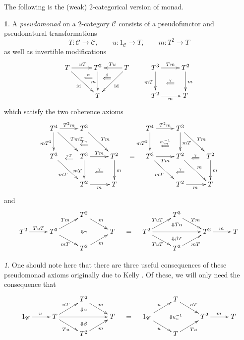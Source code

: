 \documentclass[a4paper,oneside,english]{amsart}
\numberwithin{equation}{section}
\numberwithin{figure}{section}
\theoremstyle{plain}
\theoremstyle{definition}
\newtheorem{defn}[thm]{\protect\definitionname}
\theoremstyle{remark}
\newtheorem{rem}[thm]{\protect\remarkname}
\theoremstyle{definition}
\theoremstyle{plain}
\theoremstyle{plain}
\theoremstyle{plain}
\providecommand{\definitionname}{Definition}
\providecommand{\remarkname}{Remark}
\begin{document}
The following is the (weak) 2-categorical version of monad.
\begin{defn}
A \emph{pseudomonad} on a 2-category $\mathscr{C}$ consists of a
pseudofunctor and pseudonatural transformations
\[
T\colon\mathscr{C}\to\mathscr{C},\qquad u\colon1_{\mathscr{C}}\to T,\qquad m\colon T^{2}\to T
\]
as well as invertible modifications
\[
\xymatrix@=1em{T\ar[rr]^{uT}\ar[rdrd]_{\textnormal{id}} &  & T^{2}\ar[dd]_{m} &  & T\ar[ll]_{Tu}\ar[ldld]^{\textnormal{id}} &  & T^{3}\ar[rr]^{Tm}\ar[dd]_{mT} &  & T^{2}\ar[dd]^{m}\\
 & \;\ar@{}[ru]|-{\overset{\alpha}{\Longleftarrow}} &  & \ar@{}[lu]|-{\overset{\beta}{\Longleftarrow}}\\
 &  & T &  &  &  & T^{2}\ar[rr]_{m} &  & T\ar@{}[lulu]|-{\overset{\gamma}{\Longleftarrow}}
}
\]
which satisfy the two coherence axioms
\[
\xymatrix@=1em{T^{4}\ar[rr]^{T^{2}m}\ar[dd]_{mT^{2}}\ar[rdrd]^{TmT} &  & T^{3}\ar[rrdd]^{Tm} &  &  &  & T^{4}\ar[rr]^{T^{2}m}\ar[dd]_{mT^{2}} &  & T^{3}\ar[rrdd]^{Tm}\ar[dd]^{mT}\\
 &  & \ar@{}[]|-{\overset{T\gamma}{\Longleftarrow}} &  &  &  &  & \ar@{}[]|-{\overset{m_{m}^{-1}}{\Longleftarrow}}\\
T^{3}\ar[rrdd]_{mT} & \ar@{}[]|-{\overset{\gamma T}{\Longleftarrow}} & T^{3}\ar[rr]^{Tm}\ar[dd]_{mT} &  & T^{2}\ar[dd]^{m} & = & T^{3}\ar[rrdd]_{mT}\ar[rr]_{Tm} &  & T^{2}\ar[rrdd]^{m} & \ar@{}[]|-{\overset{\gamma}{\Longleftarrow}} & T^{2}\ar[dd]^{m}\\
 &  &  & \ar@{}[]|-{\overset{\gamma}{\Longleftarrow}} &  &  &  &  & \ar@{}[]|-{\overset{\gamma}{\Longleftarrow}}\\
 &  & T^{2}\ar[rr]_{m} &  & T &  &  &  & T^{2}\ar[rr]_{m} &  & T
}
\]
and
\[
\xymatrix@=1em{ &  &  &  & T^{2}\ar[rrd]^{m} &  &  &  &  &  & T^{3}\ar[rrd]^{Tm}\\
T^{2}\ar[rr]^{TuT} &  & T^{3}\ar[rru]^{Tm}\ar[rrd]_{mT} &  & \ar@{}[]|-{\Downarrow\gamma} &  & T & = & T^{2}\ar[rur]^{TuT}\ar[rrd]_{TuT}\ar[rrrr] &  & \ar@{}[u]|-{\Downarrow T\alpha}\ar@{}[d]|-{\Downarrow\beta T} &  & T^{2}\ar[rr]^{m} &  & T\\
 &  &  &  & T^{2}\ar[rru]_{m} &  &  &  &  &  & T^{3}\ar[urr]_{mT}
}
\]
\end{defn}
\begin{rem}
One should note here that there are three useful consequences of these
pseudomonad axioms \cite[Proposition 8.1]{marm1997} originally due
to Kelly \cite{kellymaclanecoherence}. Of these, we will only need
the consequence that 
\[
\xymatrix@=1em{ &  &  &  & T^{2}\ar[rrd]^{m} &  &  &  &  &  & T\ar[rrd]^{uT}\\
1_{\mathscr{C}}\ar[rr]^{u} &  & T\ar[rru]^{uT}\ar[rrd]_{Tu}\ar[rrrr] &  & \ar@{}[u]|-{\Downarrow\alpha}\ar@{}[d]|-{\Downarrow\beta} &  & T & = & 1_{\mathscr{C}}\ar[rru]^{u}\ar[rrd]_{u} &  & \ar@{}[]|-{\Downarrow u_{u}^{-1}} &  & T^{2}\ar[rr]^{m} &  & T\\
 &  &  &  & T^{2}\ar[rru]_{m} &  &  &  &  &  & T\ar[rru]_{Tu}
}
\]

\end{rem}
\end{document}

